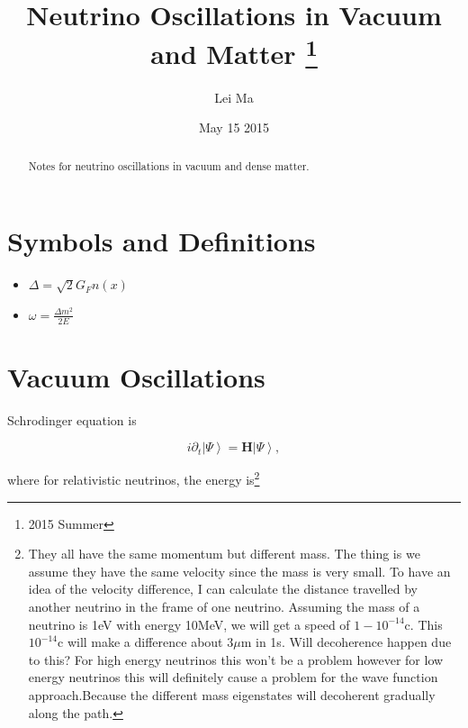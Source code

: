 \documentclass{tufte-handout}
\title{Neutrino Oscillations in Vacuum and Matter \thanks{2015 Summer}}
\author[Lei Ma]{Lei Ma}
\date{May 15 2015}  %
\newcommand{\ket}[1]{\left| #1\right\rangle}
\begin{document}
\maketitle%

\begin{abstract}
\noindent Notes for neutrino oscillations in vacuum and dense matter.
\end{abstract}

\tableofcontents



\section{Symbols and Definitions}

\begin{itemize}
\item 
$\Delta = \sqrt{2} G_F n(x) $
\item
$\omega = \frac{\Delta m^2}{2E}$
\end{itemize}


\newpage

\section{Vacuum Oscillations}

Schrodinger equation is

\begin{equation}
i\partial_t \ket{\Psi} = \mathbf H \ket{\Psi},
\end{equation}

where for relativistic neutrinos, the energy is\footnote{They all have the same momentum but different mass. The thing is we assume they have the same velocity since the mass is very small. To have an idea of the velocity difference, I can calculate the distance travelled by another neutrino in the frame of one neutrino.\newline
Assuming the mass of a neutrino is 1eV with energy 10MeV, we will get a speed of $1-10^{-14}$c. This $10^{-14}$c will make a difference about $3\mu\mathrm{ m}$ in 1s.
 \newline Will decoherence happen due to this? For high energy neutrinos this won't be a problem however for low energy neutrinos this will definitely cause a problem for the wave function approach.Because the different mass eigenstates will decoherent gradually along the path.}
\end{document}
